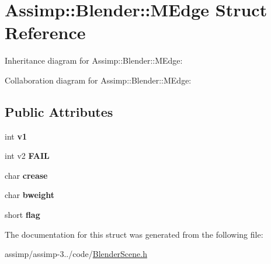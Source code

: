 \hypertarget{struct_assimp_1_1_blender_1_1_m_edge}{\section{Assimp\+:\+:Blender\+:\+:M\+Edge Struct Reference}
\label{struct_assimp_1_1_blender_1_1_m_edge}
}


Inheritance diagram for Assimp\+:\+:Blender\+:\+:M\+Edge\+:


Collaboration diagram for Assimp\+:\+:Blender\+:\+:M\+Edge\+:
\subsection*{Public Attributes}
\begin{DoxyCompactItemize}
\item 
\hypertarget{struct_assimp_1_1_blender_1_1_m_edge_aaba0a43ae5a9da00ec76cf02f9b7bab7}{int {\bfseries v1}}\label{struct_assimp_1_1_blender_1_1_m_edge_aaba0a43ae5a9da00ec76cf02f9b7bab7}

\item 
\hypertarget{struct_assimp_1_1_blender_1_1_m_edge_a15a59d28eb02451bac9cecb7adebe199}{int v2 {\bfseries F\+A\+I\+L}}\label{struct_assimp_1_1_blender_1_1_m_edge_a15a59d28eb02451bac9cecb7adebe199}

\item 
\hypertarget{struct_assimp_1_1_blender_1_1_m_edge_afa3c42a5b26a59a9eec96b4af1eefaa3}{char {\bfseries crease}}\label{struct_assimp_1_1_blender_1_1_m_edge_afa3c42a5b26a59a9eec96b4af1eefaa3}

\item 
\hypertarget{struct_assimp_1_1_blender_1_1_m_edge_a3b892c8c2f79f7e0e6ea15640a17bbfc}{char {\bfseries bweight}}\label{struct_assimp_1_1_blender_1_1_m_edge_a3b892c8c2f79f7e0e6ea15640a17bbfc}

\item 
\hypertarget{struct_assimp_1_1_blender_1_1_m_edge_adbfe43812d3f8af9620273f985ffc18e}{short {\bfseries flag}}\label{struct_assimp_1_1_blender_1_1_m_edge_adbfe43812d3f8af9620273f985ffc18e}

\end{DoxyCompactItemize}


The documentation for this struct was generated from the following file\+:\begin{DoxyCompactItemize}
\item 
assimp/assimp-\/3../code/\hyperlink{_blender_scene_8h}{Blender\+Scene.\+h}\end{DoxyCompactItemize}
